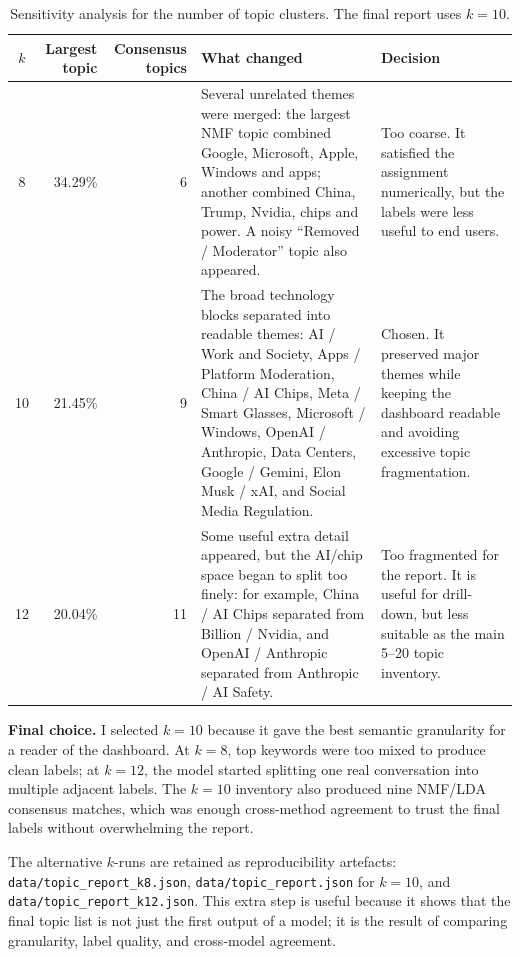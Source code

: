 \documentclass[11pt,a4paper]{article}
\newenvironment{extrabox}{%
  \par\medskip\noindent
  \def\FrameCommand{\fboxsep=6pt\fboxrule=0.6pt%
    \fcolorbox{extraboxrule}{extraboxbg}}%
  \MakeFramed{\advance\hsize-2\fboxsep\FrameRestore}%
  \noindent{\sffamily\bfseries\color{extraboxrule}Extra step.}\quad\ignorespaces%
}{\endMakeFramed\par\medskip}
\begin{document}
\begin{table}[H]
\centering
\footnotesize
\caption{Sensitivity analysis for the number of topic clusters. The final report uses \(k=10\).}
\label{tab:k-sensitivity}
\renewcommand{\arraystretch}{1.18}
\begin{tabularx}{\linewidth}{c r r X X}
\toprule
\textbf{\(k\)} & \textbf{Largest topic} & \textbf{Consensus topics} & \textbf{What changed} & \textbf{Decision} \\
\midrule
8 & 34.29\% & 6 &
Several unrelated themes were merged: the largest NMF topic combined Google, Microsoft, Apple,
Windows and apps; another combined China, Trump, Nvidia, chips and power. A noisy
``Removed / Moderator'' topic also appeared. &
Too coarse. It satisfied the assignment numerically, but the labels were less useful to end users. \\
10 & 21.45\% & 9 &
The broad technology blocks separated into readable themes: AI / Work and Society, Apps /
Platform Moderation, China / AI Chips, Meta / Smart Glasses, Microsoft / Windows, OpenAI /
Anthropic, Data Centers, Google / Gemini, Elon Musk / xAI, and Social Media Regulation. &
Chosen. It preserved major themes while keeping the dashboard readable and avoiding excessive
topic fragmentation. \\
12 & 20.04\% & 11 &
Some useful extra detail appeared, but the AI/chip space began to split too finely: for example,
China / AI Chips separated from Billion / Nvidia, and OpenAI / Anthropic separated from
Anthropic / AI Safety. &
Too fragmented for the report. It is useful for drill-down, but less suitable as the main
5--20 topic inventory. \\
\bottomrule
\end{tabularx}
\end{table}

\textbf{Final choice.} I selected \(k=10\) because it gave the best semantic granularity for a
reader of the dashboard. At \(k=8\), top keywords were too mixed to produce clean labels; at
\(k=12\), the model started splitting one real conversation into multiple adjacent labels. The
\(k=10\) inventory also produced nine NMF/LDA consensus matches, which was enough cross-method
agreement to trust the final labels without overwhelming the report.

\begin{extrabox}
The alternative \(k\)-runs are retained as reproducibility artefacts:
\texttt{data/topic\_report\_k8.json}, \texttt{data/topic\_report.json} for \(k=10\), and
\texttt{data/topic\_report\_k12.json}. This extra step is useful because it shows that the final
topic list is not just the first output of a model; it is the result of comparing granularity,
label quality, and cross-model agreement.
\end{extrabox}
\end{document}
